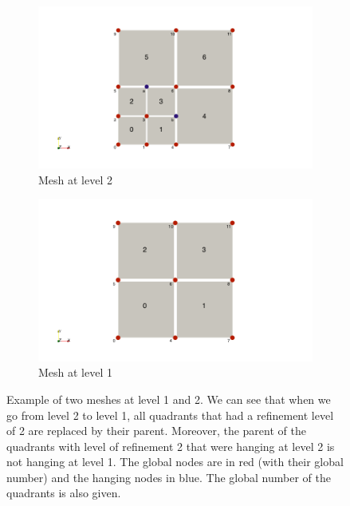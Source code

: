 \begin{figure}
\centering
\begin{subfigure}{.5\textwidth}
  \centering
  \includegraphics[width=1.2\linewidth]{Implementation/multi_ex_2.png}
  \caption{Mesh at level 2}
  \label{multi_ex_2}
\end{subfigure}%
\begin{subfigure}{.5\textwidth}
  \centering
  \includegraphics[width=1.2\linewidth]{Implementation/multi_ex_1.png}
  \caption{Mesh at level 1}
  \label{multi_ex_1}
\end{subfigure}
\caption{Example of two meshes at level 1 and 2. We can see that when we go from level 2 to level 1, all quadrants that had a refinement level of 2 are replaced by their parent. Moreover, the parent of the quadrants with level of refinement 2 that were hanging at level 2 is not hanging at level 1. The global nodes are in red (with their global number) and the hanging nodes in blue. The global number of the quadrants is also given.}
\label{multi_ex}
\end{figure}

